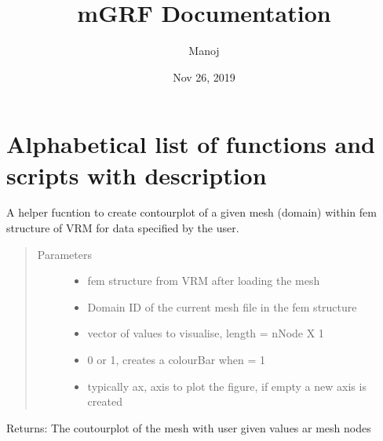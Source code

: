 \documentclass[a4paper,10pt,english]{sphinxmanual}
\title{mGRF Documentation}
\date{Nov 26, 2019}
\author{Manoj}
\begin{document}
\pagestyle{empty}
\sphinxmaketitle
\pagestyle{plain}
\sphinxtableofcontents
\pagestyle{normal}
\label{\detokenize{index::doc}}



\chapter{Alphabetical list of functions and scripts with description}
\label{\detokenize{index:module-mGRF}}\label{\detokenize{index:alphabetical-list-of-functions-and-scripts-with-description}}

\begin{fulllineitems}
\label{\detokenize{index:mGRF.contourDomainPlot}}
A helper fucntion to create contourplot of a given mesh (domain) within
fem structure of VRM for data specified by the user.
\begin{quote}\begin{description}
\item[{Parameters}] \leavevmode\begin{itemize}
\item {} 
 \textendash{} fem structure from VRM after loading the mesh

\item {} 
 \textendash{} Domain ID of the current mesh file in the fem structure

\item {} 
 \textendash{} vector of values to visualise, length = nNode X 1

\item {} 
 \textendash{} 0 or 1, creates a colourBar when = 1

\item {} 
 \textendash{} typically ax, axis to plot the figure, if empty a new axis is created

\end{itemize}

\end{description}\end{quote}

Returns:
The coutourplot of the mesh with user given values ar mesh nodes

\end{fulllineitems}
\end{document}
